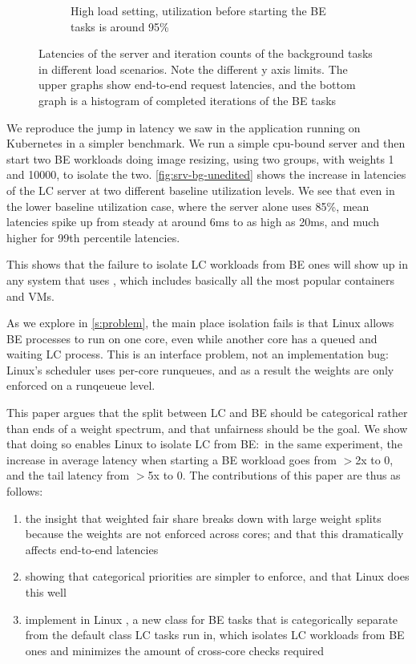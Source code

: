 \begin{figure}[t]
\begin{subfigure}[b]{0.49\columnwidth}
        \caption{High load setting, utilization before starting the BE tasks is
        around 95\%}\label{fig:srv-bg-unedited-high}
    \end{subfigure}
    \vspace{4pt}
    \caption{Latencies of the server and iteration counts of the background
    tasks in different load scenarios. Note the different y axis limits. The
    upper graphs show end-to-end request latencies, and the bottom graph is a
    histogram of completed iterations of the BE tasks}\label{fig:srv-bg-unedited}
\end{figure}

We reproduce the jump in latency we saw in the application running on Kubernetes
in a simpler benchmark. We run a simple cpu-bound server and then start two BE
workloads doing image resizing, using two \cgroups{} groups, with weights 1 and
10000, to isolate the two. \autoref{fig:srv-bg-unedited} shows the increase in
latencies of the LC server at two different baseline utilization levels. We see
that even in the lower baseline utilization case, where the server alone uses
85\%, mean latencies spike up from steady at around 6ms to as high as 20ms, and
much higher for 99th percentile latencies.

This shows that the failure to isolate LC workloads from BE ones will show up in
any system that uses \cgroups{}, which includes basically all the most popular
containers and VMs.

As we explore in \autoref{s:problem}, the main place \cgroups{} isolation fails
is that Linux allows BE processes to run on one core, even while another core
has a queued and waiting LC process. This is an interface problem, not an
implementation bug: Linux's scheduler uses per-core runqueues, and as a result
the weights are only enforced on a runqeueue level.

This paper argues that the split between LC and BE should be categorical rather
than ends of a weight spectrum, and that unfairness should be the goal. We show
that doing so enables Linux to isolate LC from BE:\ in the same experiment, the
increase in average latency when starting a BE workload goes from $>$2x to 0,
and the tail latency from $>$5x to 0. The contributions of this paper are thus
as follows: 
\begin{enumerate}
    \item the insight that weighted fair share breaks down with large weight
    splits because the weights are not enforced across cores; and that this
    dramatically affects end-to-end latencies
    \item showing that categorical priorities are simpler to enforce, and that
    Linux does this well
    \item implement in Linux \schedbe{}, a new class for BE tasks that is
    categorically separate from the default class LC tasks run in, which
    isolates LC workloads from BE ones and minimizes the amount of cross-core
    checks required
\end{enumerate}

